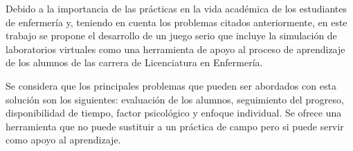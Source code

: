 Debido a la importancia de las prácticas en la vida académica de los estudiantes
de enfermería y, teniendo en cuenta los problemas citados anteriormente, en este
trabajo se propone el desarrollo de un juego serio que incluye la simulación de
laboratorios virtuales como una herramienta de apoyo al proceso de aprendizaje
de los alumnos de las carrera de Licenciatura en Enfermería. 

Se considera que los principales problemas que pueden ser abordados con esta
solución son los siguientes: evaluación de los alumnos, seguimiento del progreso, disponibilidad de
tiempo, factor psicológico y enfoque individual. Se ofrece una herramienta que no puede
sustituir a un práctica de campo pero si puede servir como apoyo al aprendizaje.

